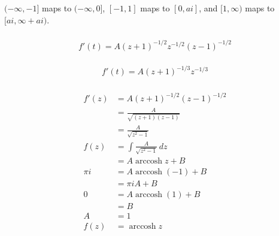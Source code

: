\documentclass{article}
\newcommand{\arccosh}{\operatorname{arccosh}}
\begin{document}
$(-\infty, -1]$ maps to $(-\infty, 0]$, $[-1, 1]$ maps to $[0, a i]$, and $[1, \infty)$ maps to $[a i, \infty + a i)$.

\setcounter{subsubsection}{4}
\subsubsection{}

\[f'(t) = A (z + 1)^{-1 / 2} z^{-1 / 2} (z - 1)^{-1 / 2}\]

\setcounter{subsubsection}{6}
\subsubsection{}

\[f'(t) = A (z + 1)^{-1 / 3} z^{-1 / 3}\]

\setcounter{subsubsection}{8}
\subsubsection{}

\begin{align*}
  f'(z) & = A (z + 1)^{-1 / 2} (z - 1)^{-1 / 2} \\
        & = \frac{A}{\sqrt{(z + 1) (z - 1)}}    \\
        & = \frac{A}{\sqrt{z^2 - 1}}            \\
  f(z)  & = \int \frac{A}{\sqrt{z^2 - 1}} \,d z \\
        & = A \arccosh z + B                    \\
  \pi i & = A \arccosh (-1) + B                 \\
        & = \pi i A + B                         \\
  0     & = A \arccosh (1) + B                  \\
        & = B                                   \\
  A     & = 1                                   \\
  f(z)  & = \arccosh z
\end{align*}

\setcounter{subsubsection}{10}
\subsubsection{}
\end{document}
